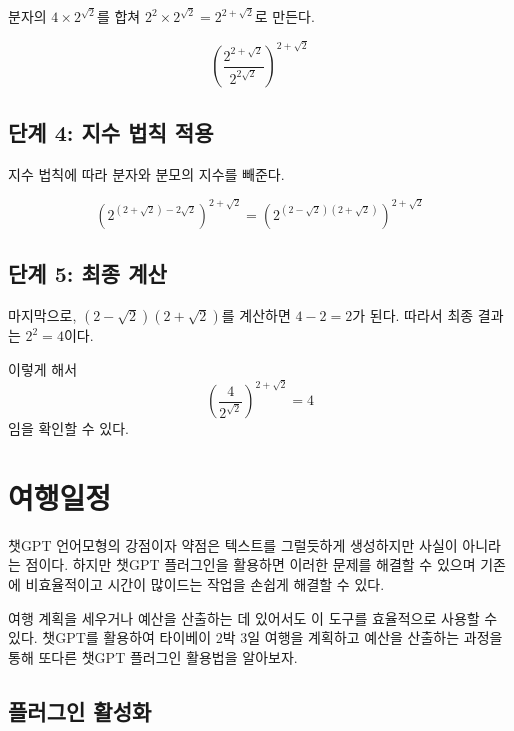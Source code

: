 \documentclass[
  letterpaper,
]{book}
\begin{document}
\begin{tcolorbox}
분자의 \(4 \times 2^{\sqrt{2}}\)를 합쳐
\(2^2 \times 2^{\sqrt{2}} = 2^{2+\sqrt{2}}\)로 만든다.

\[
\left(\frac{2^{2+\sqrt{2}}}{2^{2\sqrt{2}}}\right)^{2+\sqrt{2}}
\]

\hypertarget{uxb2e8uxacc4-4-uxc9c0uxc218-uxbc95uxce59-uxc801uxc6a9}{%
\subsection*{단계 4: 지수 법칙
적용}\label{uxb2e8uxacc4-4-uxc9c0uxc218-uxbc95uxce59-uxc801uxc6a9}}

지수 법칙에 따라 분자와 분모의 지수를 빼준다.

\[
\left(2^{(2+\sqrt{2}) - 2\sqrt{2}}\right)^{2+\sqrt{2}} = \left(2^{(2 - \sqrt{2})(2 + \sqrt{2})}\right)^{2+\sqrt{2}}
\]

\hypertarget{uxb2e8uxacc4-5-uxcd5cuxc885-uxacc4uxc0b0}{%
\subsection*{단계 5: 최종
계산}\label{uxb2e8uxacc4-5-uxcd5cuxc885-uxacc4uxc0b0}}

마지막으로, \((2 - \sqrt{2})(2 + \sqrt{2})\)를 계산하면 \(4 - 2 = 2\)가
된다. 따라서 최종 결과는 \(2^2 = 4\)이다.

이렇게 해서 \[
\left(\frac{4}{2^{\sqrt{2}}}\right)^{2+\sqrt{2}} = 4
\]임을 확인할 수 있다.

\end{tcolorbox}

\hypertarget{uxc5ecuxd589uxc77cuxc815}{%
\section{여행일정}\label{uxc5ecuxd589uxc77cuxc815}}

챗GPT 언어모형의 강점이자 약점은 텍스트를 그럴듯하게 생성하지만 사실이
아니라는 점이다. 하지만 챗GPT 플러그인을 활용하면 이러한 문제를 해결할
수 있으며 기존에 비효율적이고 시간이 많이드는 작업을 손쉽게 해결할 수
있다.

여행 계획을 세우거나 예산을 산출하는 데 있어서도 이 도구를 효율적으로
사용할 수 있다. 챗GPT를 활용하여 타이베이 2박 3일 여행을 계획하고 예산을
산출하는 과정을 통해 또다른 챗GPT 플러그인 활용법을 알아보자.

\hypertarget{uxd50cuxb7ecuxadf8uxc778-uxd65cuxc131uxd654}{%
\subsection{플러그인
활성화}\label{uxd50cuxb7ecuxadf8uxc778-uxd65cuxc131uxd654}}
\end{document}
